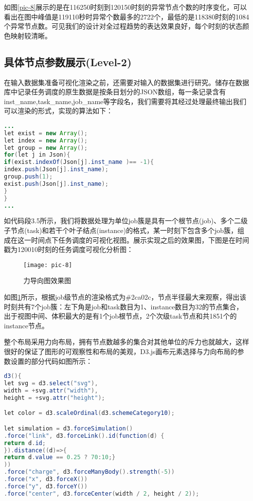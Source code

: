 如图\ref{pic-8}展示的是在116250时刻到120150时刻的异常节点个数的时序变化，可以看出在图中峰值是119110秒时异常个数最多的2722个，最低的是118380时刻的1084个异常节点数。可见我们的设计对全过程趋势的表达效果良好，每个时刻的状态颜色映射较清晰。

\newpage
\subsection{具体节点参数展示(Level-2)}
在输入数据集准备可视化渲染之前，还需要对输入的数据集进行研究。储存在数据库中记录任务调度的原生数据是按条目划分的JSON数组，每一条记录含有inst\_name,task\_name,job\_name等字段名，我们需要将其经过处理最终输出我们可以渲染的形式，实现的算法如下：

\begin{lstlisting}[caption=格式化row data,frame=shadowbox,language={java}]
...
let exist = new Array();
let index = new Array();
let group = new Array();
for(let j in Json){
if(exist.indexOf(Json[j].inst_name )== -1){
index.push(Json[j].inst_name);
group.push(1);
exist.push(Json[j].inst_name);
}
}
...
\end{lstlisting}

如代码段3.5所示，我们将数据处理为单位job簇是具有一个根节点(job)、多个二级子节点(task)和若干个叶子结点(instance)的格式，某一时刻下包含多个job簇，组成在这一时间点下任务调度的可视化视图。展示实现之后的效果图，下图是在时间戳为120010时刻的任务调度可视化分析图：

\begin{figure}[h]
	\centering
	\texttt{[image: pic-8]}
	\caption{力导向图效果图}
	\label{pic-9}
\end{figure}

如图\ref{pic-9}所示，根据job级节点的渲染格式为\#2ca02c，节点半径最大来观察，得出该时刻共有7个job簇：左下角是job和task数目为1、instance数目为32的节点集合，出于视图中间、体积最大的是有1个job根节点，2个次级task节点和共1851个的instance节点。

整个布局采用力向布局，拥有节点数越多的集合对其他单位的斥力也就越大，这样很好的保证了图形的可观察性和布局的美观，D3.js画布元素选择与力向布局的参数设置的部分代码如图所示：

\begin{lstlisting}[caption=基于D3关于svg图形的实现,frame=shadowbox,language={java}]
d3(){
let svg = d3.select("svg"),
width = +svg.attr("width"),
height = +svg.attr("height");

let color = d3.scaleOrdinal(d3.schemeCategory10);

let simulation = d3.forceSimulation()
.force("link", d3.forceLink().id(function(d) {
return d.id;
}).distance((d)=>{
return d.value == 0.25 ? 70:10;}
))
.force("charge", d3.forceManyBody().strength(-5))
.force("x", d3.forceX())
.force("y", d3.forceY())
.force("center", d3.forceCenter(width / 2, height / 2));
\end{lstlisting}


